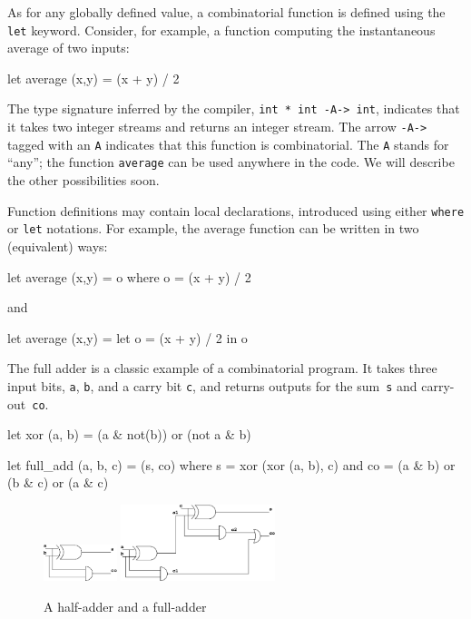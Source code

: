 \documentclass[11pt,titlepage,twoside]{report}
\makeatletter
\newcommand{\zls}[1]{{\@span{class="zelusinline"}#1}}
\newcommand{\zls}[1]{\texttt{#1}}
\renewcommand{\zls}[1]{\texttt{#1}}
\newcommand{\zlsmsg}[1]{\texttt{#1}}
\makeatother
\begin{document}
As for any globally defined value, a combinatorial function
is defined using the \zls{let} keyword.
Consider, for example, a function computing the
instantaneous average of two inputs:
\begin{chklisting}[withresult]
let average (x,y) = (x + y) / 2
\end{chklisting}
The type signature inferred by the compiler, \zlsmsg{int * int -A-> int},
indicates that it takes two integer streams and returns an integer stream.
The arrow \texttt{-A->} tagged with an \texttt{A} indicates that this 
function is combinatorial.
The \texttt{A} stands for ``any''; the function \texttt{average} can be used 
anywhere in the code.
We will describe the other possibilities soon.

Function definitions may contain local declarations, introduced using
either \zls{where} or \zls{let} notations. For example, the average function 
can be written in two (equivalent) ways:
\begin{chklisting}
let average (x,y) = o where o = (x + y) / 2
\end{chklisting}
and
\begin{chklisting}
let average (x,y) = let o = (x + y) / 2 in o
\end{chklisting}

The full adder is a classic example of a combinatorial program.
It takes three input bits, \zls{a}, \zls{b}, and a carry bit \zls{c}, and 
returns outputs for the sum~\zls{s} and carry-out~\zls{co}.
\begin{chklisting}[withresult,label=xor]
let xor (a, b) = (a & not(b)) or (not a & b)

let full_add (a, b, c) = (s, co) where
       s = xor (xor (a, b), c)
   and co = (a & b) or (b & c) or (a & c)
\end{chklisting}

\begin{figure}
\centering
\includegraphics[width=0.19\textwidth]{Fig/half_adder}
\hfil
\includegraphics[width=0.4\textwidth]{Fig/full_adder}
\caption{A half-adder and a full-adder\label{half-adder}}
\end{figure}
\end{document}
